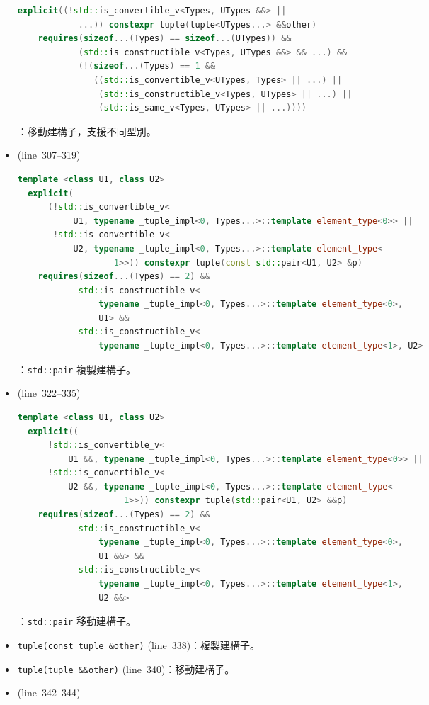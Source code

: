 \documentclass[a4paper,12pt]{article}
\begin{document}
\begin{itemize}
\begin{lstlisting}[language=C++]
  explicit((!std::is_convertible_v<Types, UTypes &&> ||
            ...)) constexpr tuple(tuple<UTypes...> &&other)
    requires(sizeof...(Types) == sizeof...(UTypes)) &&
            (std::is_constructible_v<Types, UTypes &&> && ...) &&
            (!(sizeof...(Types) == 1 &&
               ((std::is_convertible_v<UTypes, Types> || ...) ||
                (std::is_constructible_v<Types, UTypes> || ...) ||
                (std::is_same_v<Types, UTypes> || ...))))
\end{lstlisting}
：移動建構子，支援不同型別。
\item (line~307--319)
\begin{lstlisting}[language=C++]
  template <class U1, class U2>
  explicit(
      (!std::is_convertible_v<
           U1, typename _tuple_impl<0, Types...>::template element_type<0>> ||
       !std::is_convertible_v<
           U2, typename _tuple_impl<0, Types...>::template element_type<
                   1>>)) constexpr tuple(const std::pair<U1, U2> &p)
    requires(sizeof...(Types) == 2) &&
            std::is_constructible_v<
                typename _tuple_impl<0, Types...>::template element_type<0>,
                U1> &&
            std::is_constructible_v<
                typename _tuple_impl<0, Types...>::template element_type<1>, U2>
\end{lstlisting}
：\verb|std::pair| 複製建構子。
\item (line~322--335)
\begin{lstlisting}[language=C++]
  template <class U1, class U2>
  explicit((
      !std::is_convertible_v<
          U1 &&, typename _tuple_impl<0, Types...>::template element_type<0>> ||
      !std::is_convertible_v<
          U2 &&, typename _tuple_impl<0, Types...>::template element_type<
                     1>>)) constexpr tuple(std::pair<U1, U2> &&p)
    requires(sizeof...(Types) == 2) &&
            std::is_constructible_v<
                typename _tuple_impl<0, Types...>::template element_type<0>,
                U1 &&> &&
            std::is_constructible_v<
                typename _tuple_impl<0, Types...>::template element_type<1>,
                U2 &&>
\end{lstlisting}
：\verb|std::pair| 移動建構子。
\item \verb|tuple(const tuple &other)| (line~338)：複製建構子。
\item \verb|tuple(tuple &&other)| (line~340)：移動建構子。
\item (line~342--344)
\begin{lstlisting}[language=C++]

\end{lstlisting}
\end{itemize}
\end{document}
